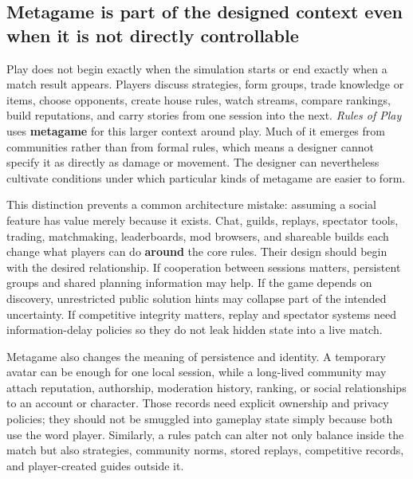 \subsection{Metagame is part of the designed context even when it is not directly controllable}\label{06-engine-ii-ch046-metagame-is-part-of-the-designed-context-even-when-it-is-not-directly-controllable}

\hypertarget{06-engine-ii-ch046-metagame-is-part-of-the-designed-context-even-when-it-is-not-directly-controllable}{}

Play does not begin exactly when the simulation starts or end exactly when a match result appears. Players discuss strategies, form groups, trade knowledge or items, choose opponents, create house rules, watch streams, compare rankings, build reputations, and carry stories from one session into the next. \emph{Rules of Play} uses \textbf{metagame} for this larger context around play. Much of it emerges from communities rather than from formal rules, which means a designer cannot specify it as directly as damage or movement. The designer can nevertheless cultivate conditions under which particular kinds of metagame are easier to form.

This distinction prevents a common architecture mistake: assuming a social feature has value merely because it exists. Chat, guilds, replays, spectator tools, trading, matchmaking, leaderboards, mod browsers, and shareable builds each change what players can do \textbf{around} the core rules. Their design should begin with the desired relationship. If cooperation between sessions matters, persistent groups and shared planning information may help. If the game depends on discovery, unrestricted public solution hints may collapse part of the intended uncertainty. If competitive integrity matters, replay and spectator systems need information-delay policies so they do not leak hidden state into a live match.

Metagame also changes the meaning of persistence and identity. A temporary avatar can be enough for one local session, while a long-lived community may attach reputation, authorship, moderation history, ranking, or social relationships to an account or character. Those records need explicit ownership and privacy policies; they should not be smuggled into gameplay state simply because both use the word player. Similarly, a rules patch can alter not only balance inside the match but also strategies, community norms, stored replays, competitive records, and player-created guides outside it.

